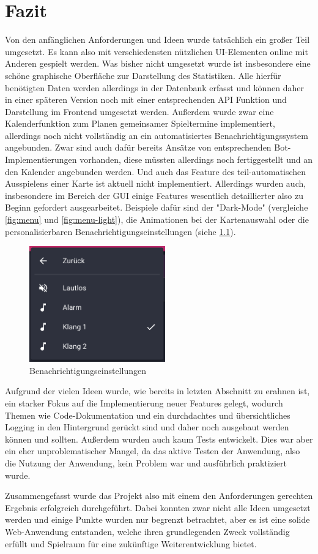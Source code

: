 \chapter{Fazit}
Von den anfänglichen Anforderungen und Ideen wurde tatsächlich ein großer Teil umgesetzt. Es kann also mit verschiedensten nützlichen UI-Elementen online mit Anderen gespielt werden. Was bisher nicht umgesetzt wurde ist insbesondere eine schöne graphische Oberfläche zur Darstellung des Statistiken. Alle hierfür benötigten Daten werden allerdings in der Datenbank erfasst und können daher in einer späteren Version noch mit einer entsprechenden API Funktion und Darstellung im Frontend umgesetzt werden. Außerdem wurde zwar eine Kalenderfunktion zum Planen gemeinsamer Spieltermine implementiert, allerdings noch nicht vollständig an ein automatisiertes Benachrichtigungssystem angebunden. Zwar sind auch dafür bereits Ansätze von entsprechenden Bot-Implementierungen vorhanden, diese müssten allerdings noch fertiggestellt und an den Kalender angebunden werden. Und auch das Feature des teil-automatischen Ausspielens einer Karte ist aktuell nicht implementiert. Allerdings wurden auch, insbesondere im Bereich der GUI einige Features wesentlich detaillierter also zu Beginn gefordert ausgearbeitet. Beispiele dafür sind der "Dark-Mode" (vergleiche \cref{fig:menu} und \cref{fig:menu-light}), die Animationen bei der Kartenauswahl oder die personalisierbaren Benachrichtigungseinstellungen (siehe \cref{fig:sound}).

\begin{figure}[h]
	\centering
	\includegraphics[height=5cm]{images/sound.png}
	\caption{Benachrichtigungseinstellungen}
	\label{fig:sound}
\end{figure}

Aufgrund der vielen Ideen wurde, wie bereits in letzten Abschnitt zu erahnen ist, ein starker Fokus auf die Implementierung neuer Features gelegt, wodurch Themen wie Code-Dokumentation und ein durchdachtes und übersichtliches Logging in den Hintergrund gerückt sind und daher noch ausgebaut werden können und sollten. Außerdem wurden auch kaum Tests entwickelt. Dies war aber ein eher unproblematischer Mangel, da das aktive Testen der Anwendung, also die Nutzung der Anwendung, kein Problem war und ausführlich praktiziert wurde.

Zusammengefasst wurde das Projekt also mit einem den Anforderungen gerechten Ergebnis erfolgreich durchgeführt. Dabei konnten zwar nicht alle Ideen umgesetzt werden und einige Punkte wurden nur begrenzt betrachtet, aber es ist eine solide Web-Anwendung entstanden, welche ihren grundlegenden Zweck vollständig erfüllt und Spielraum für eine zukünftige Weiterentwicklung bietet.  

